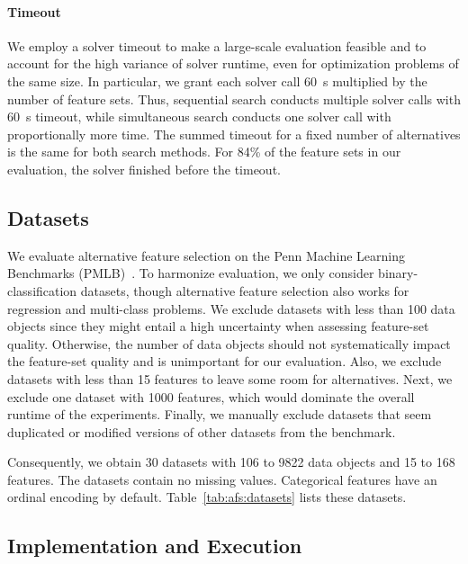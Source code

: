 \documentclass{article}
\theoremstyle{definition}
\begin{document}
\paragraph{Timeout}

We employ a solver timeout to make a large-scale evaluation feasible and to account for the high variance of solver runtime, even for optimization problems of the same size.
In particular, we grant each solver call 60~s multiplied by the number of feature sets.
Thus, sequential search conducts multiple solver calls with 60~s timeout, while simultaneous search conducts one solver call with proportionally more time.
The summed timeout for a fixed number of alternatives is the same for both search methods.
For 84\% of the feature sets in our evaluation, the solver finished before the timeout.

\subsection{Datasets}
\label{sec:afs:experimental-design:datasets}

We evaluate alternative feature selection on the Penn Machine Learning Benchmarks (PMLB)~\cite{olson2017pmlb,romano2021pmlb}.
To harmonize evaluation, we only consider binary-classification datasets, though alternative feature selection also works for regression and multi-class problems.
We exclude datasets with less than 100 data objects since they might entail a high uncertainty when assessing feature-set quality.
Otherwise, the number of data objects should not systematically impact the feature-set quality and is unimportant for our evaluation.
Also, we exclude datasets with less than 15 features to leave some room for alternatives.
Next, we exclude one dataset with 1000 features, which would dominate the overall runtime of the experiments.
Finally, we manually exclude datasets that seem duplicated or modified versions of other datasets from the benchmark.

Consequently, we obtain 30 datasets with 106 to 9822 data objects and 15 to 168 features.
The datasets contain no missing values.
Categorical features have an ordinal encoding by default.
Table~\ref{tab:afs:datasets} lists these datasets.

\subsection{Implementation and Execution}
\label{sec:afs:experimental-design:implementation}
\end{document}
